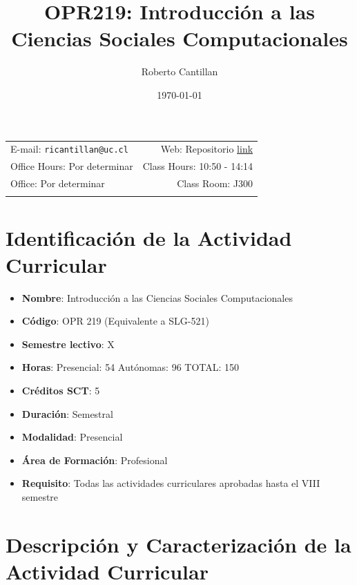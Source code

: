 \documentclass[11pt,letter,]{article}
\title{OPR219: Introducción a las Ciencias Sociales Computacionales}
\author{Roberto Cantillan}
\date{\today}
\providecommand{\tightlist}{%
  \setlength{\itemsep}{0pt}\setlength{\parskip}{0pt}}
\begin{document}
  

\maketitle

\thispagestyle{firststyle}

\noindent \begin{tabular*}{\textwidth}{ @{\extracolsep{\fill}} lr @{\extracolsep{\fill}}}
E-mail: \texttt{ricantillan@uc.cl} & Web: Repositorio \href{https://github.com/rcantillan/OPR-219-CIencias-Sociales-Computacionales}{link}\\
Office Hours: Por determinar  &  Class Hours: 10:50 - 14:14\\
Office: Por determinar  & Class Room: J300\\
  &  \\
\hline
\end{tabular*}

\vspace{2mm}

\hypertarget{identificaciuxf3n-de-la-actividad-curricular}{%
\section{Identificación de la Actividad
Curricular}\label{identificaciuxf3n-de-la-actividad-curricular}}

\begin{itemize}
\tightlist
\item
  \textbf{Nombre}: Introducción a las Ciencias Sociales Computacionales
\item
  \textbf{Código}: OPR 219 (Equivalente a SLG-521)
\item
  \textbf{Semestre lectivo}: X
\item
  \textbf{Horas}: Presencial: 54 \textbar{} Autónomas: 96 \textbar{}
  TOTAL: 150
\item
  \textbf{Créditos SCT}: 5
\item
  \textbf{Duración}: Semestral
\item
  \textbf{Modalidad}: Presencial
\item
  \textbf{Área de Formación}: Profesional
\item
  \textbf{Requisito}: Todas las actividades curriculares aprobadas hasta
  el VIII semestre
\end{itemize}

\hypertarget{descripciuxf3n-y-caracterizaciuxf3n-de-la-actividad-curricular}{%
\section{Descripción y Caracterización de la Actividad
Curricular}\label{descripciuxf3n-y-caracterizaciuxf3n-de-la-actividad-curricular}}
\end{document}
